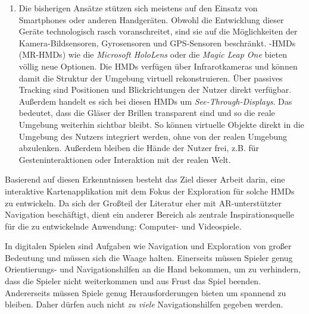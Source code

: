\begin{enumerate}
\item Die bisherigen Ansätze stützen sich meistens auf den Einsatz von Smartphones oder anderen Handgeräten.
Obwohl die Entwicklung dieser Geräte technologisch rasch voranschreitet, sind sie auf die Möglichkeiten der Kamera-Bildsensoren, Gyrosensoren und \gls{GPS}-Sensoren beschränkt.
\emph{}-\glspl{HMD} (\gls{MR}-\glspl{HMD}) wie die \emph{Microsoft HoloLens} \parencite{Microsoft2018} oder die \emph{Magic Leap One} \parencite{MagicLeap2018} bieten völlig neue Optionen.
Die \glspl{HMD} verfügen über Infrarotkameras und können damit die  Struktur der Umgebung virtuell rekonstruieren.
Über passives Tracking sind Positionen und Blickrichtungen der Nutzer direkt verfügbar.
Außerdem handelt es sich bei diesen \glspl{HMD} um \emph{See-Through-Displays}.
Das bedeutet, dass die Gläser der Brillen transparent sind und so die reale Umgebung weiterhin sichtbar bleibt.
So können virtuelle Objekte direkt in die Umgebung des Nutzers integriert werden, ohne von der realen Umgebung abzulenken.
Außerdem bleiben die Hände der Nutzer frei, z.B. für Gesteninteraktionen oder Interaktion mit der realen Welt.
\end{enumerate}

Basierend auf diesen Erkenntnissen besteht das Ziel dieser Arbeit darin, eine interaktive Kartenapplikation mit dem Fokus der Exploration für solche \glspl{HMD} zu entwickeln.
Da sich der Großteil der Literatur eher mit \gls{AR}-unterstützter Navigation beschäftigt, dient ein anderer Bereich als zentrale Inspirationsquelle für die zu entwickelnde Anwendung: Computer- und Videospiele.

In digitalen Spielen sind Aufgaben wie Navigation und Exploration von großer Bedeutung und müssen sich die Waage halten.
Einerseits müssen Spieler genug Orien\-tie\-rungs- und Navigationshilfen an die Hand bekommen, um zu verhindern, dass die Spieler nicht weiterkommen und aus Frust das Spiel beenden.
Andererseits müssen Spiele genug Herausforderungen bieten um spannend zu bleiben.
Daher dürfen auch nicht \emph{zu viele} Navigationshilfen gegeben werden.

